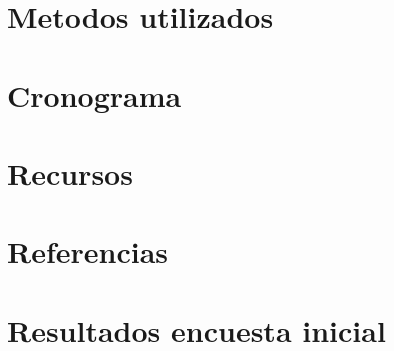 \documentclass[letter,openright,12pt]{book}
\begin{document}
  \chapter{Metodos utilizados}
  
  
  
  \chapter{Cronograma}
  
  \chapter{Recursos}
  
  
  
  
  \chapter{Referencias}
  
  \renewcommand\appendixname{Anexo}
  
  \appendix
  \chapter{Resultados encuesta inicial} \label{anexo1}
  
  
  
  
\end{document}
